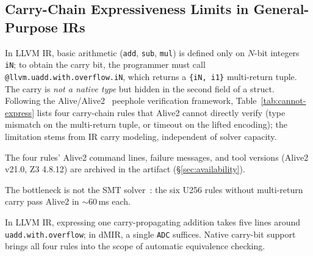 \subsection{Carry-Chain Expressiveness Limits in General-Purpose IRs}

{\sloppy
In LLVM IR, basic arithmetic (\texttt{add}, \texttt{sub}, \texttt{mul})
is defined only on $N$-bit integers \texttt{iN}; to obtain the carry
bit, the programmer must call
\texttt{@llvm.uadd.with.overflow.iN}, which returns a
\texttt{\{iN, i1\}} multi-return tuple. The carry is \emph{not a native
type} but hidden in the second field of a struct. Following the
Alive/Alive2~\cite{alive,alive2} peephole verification framework,
Table~\ref{tab:cannot-express} lists four carry-chain rules that
Alive2 cannot directly verify (type mismatch on the multi-return
tuple, or timeout on the lifted encoding); the limitation stems from
IR carry modeling, independent of solver capacity.\par}



The four rules' Alive2 command lines, failure messages, and tool
versions (Alive2 v21.0, Z3 4.8.12) are archived in the artifact
(\S\ref{sec:availability}).

The bottleneck is not the SMT solver~\cite{demoura2008z3}: the six
U256 rules without multi-return carry pass Alive2 in $\sim$60\,ms each.

{\sloppy
In LLVM IR, expressing one carry-propagating addition takes five lines
around \texttt{uadd.with.overflow}; in dMIR, a single \texttt{ADC}
suffices. Native carry-bit support brings all four rules into the scope
of automatic equivalence checking.\par}

